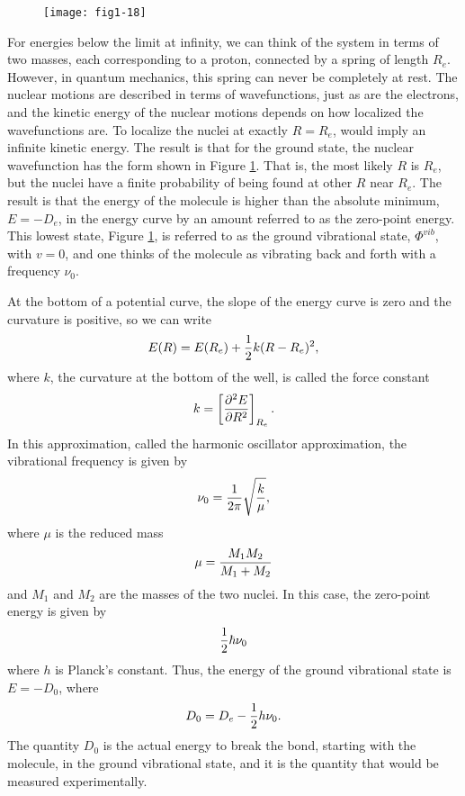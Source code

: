 \begin{figure}
\begin{center}
\texttt{[image: fig1-18]}
\end{center}
\caption{}
\label{fig1-18}
\end{figure}
    
For energies below the limit at infinity, we can think of the system
in terms of two masses, each corresponding to a proton, connected by a
spring of length $R_e$. However, in quantum mechanics, this spring can
never be completely at rest. The nuclear motions are described in
terms of wavefunctions, just as are the electrons, and the kinetic
energy of the nuclear motions depends on how localized the
wavefunctions are. To localize the nuclei at exactly $R = R_e$, would
imply an infinite kinetic energy. The result is that for the ground
state, the nuclear wavefunction has the form shown in Figure
\ref{fig1-18}.  That is, the most likely $R$ is $R_e$, but the nuclei
have a finite probability of being found at other $R$ near $R_e$. The
result is that the energy of the molecule is higher than the absolute
minimum, $E = -D_e$, in the energy curve by an amount referred to as
the zero-point energy. This lowest state, Figure \ref{fig1-18}, is
referred to as the ground vibrational state, $\Phi^{vib}$, with $v =
0$, and one thinks of the molecule as vibrating back and forth with a
frequency $\nu_0$.

At the bottom of a potential curve, the slope of the energy curve is
zero and the curvature is positive, so we can write
\begin{equation}
E(R) = E(R_e) + {1 \over 2} k(R - R_e)^2,
\end{equation}
where $k$, the curvature at the bottom of the well, is called the force constant
\begin{equation}
k = \left[ {\partial^2E \over \partial R^2} \right]_{R_e} .
\end{equation}
In this approximation, called the harmonic oscillator approximation, the
vibrational frequency is given by
\begin{equation}
\nu_0 = {1 \over 2 \pi} \sqrt{{k \over \mu}} ,
\end{equation}
where $\mu$ is the reduced mass
\begin{equation}
\mu = {M_1M_2 \over M_1+M_2}
\end{equation}
and $M_1$ and $M_2$ are the masses of the two nuclei. In this case, the 
zero-point energy is given by
\begin{equation}
{1 \over 2} \hbar \nu_0
\label{eqno1-45}
\end{equation}
where $h$ is Planck's constant. Thus, the energy of the ground vibrational 
state is $E = -D_0$, where
\begin{equation}
D_0 = D_e - {1 \over 2} h \nu_0 .
\end{equation}
The quantity $D_0$ is the actual energy to break the bond, starting with 
the molecule, in the ground vibrational state, and it is the quantity that 
would be measured experimentally.
    
